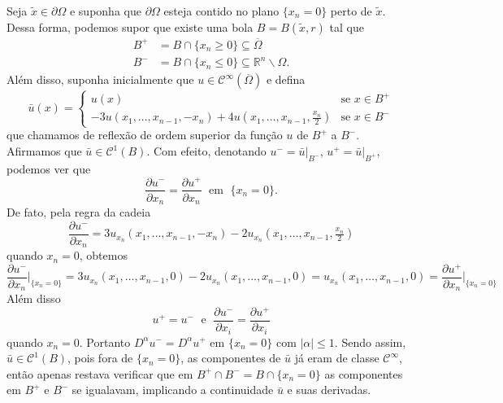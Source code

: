 \documentclass[a4paper, 11pt]{book}
\theoremstyle{definition}
\newcommand{\bR}{\mathbb{R}}
\newcommand{\cC}{\mathcal{C}}
\begin{document}
\begin{prf}
    Seja $\tilde x \in \partial\Omega$ e suponha que $\partial\Omega$ esteja contido no plano $\{x_n = 0\}$ perto de $\tilde x$.
    Dessa forma, podemos supor que existe uma bola $B = B(\tilde x, r)$ tal que
    \[
        \begin{aligned}
            B^+ &= B \cap \{x_n \geqslant 0\} \subseteq \overline\Omega\\
            B^- &= B \cap \{x_n \leqslant 0\} \subseteq \bR^n \smallsetminus \Omega.
        \end{aligned}
    \]
    Além disso, suponha inicialmente que $u \in \cC^\infty(\overline\Omega)$ e defina
    \[
        \bar u(x) =
        \left\{ 
            \begin{array}{ll}
                u(x) & \text{se } x\in B^+\\
                -3u(x_1,\dots,x_{n-1}, -x_n) + 4u(x_1,\dots,x_{n-1},\frac{x_n}{2}) & \text{se } x \in B^-
            \end{array}
        \right.
    \]
    que chamamos de reflexão de ordem superior da função $u$ de $B^+$ a $B^-$.
    Afirmamos que $\bar u \in \cC^1(B)$.
    Com efeito, denotando $u^- = \bar u \big|_{B^-}$, $u^+ = \bar u \big|_{B^+}$, podemos ver que
    \[
        \dfrac{\partial u^-}{\partial x_n} = \dfrac{\partial u^+}{\partial x_n} \;\text{ em }\; \{x_n = 0\}.
    \]
    De fato, pela regra da cadeia
    \[
        \dfrac{\partial u^-}{\partial x_n} = 3 u_{x_n}(x_1,\dots,x_{n-1}, -x_n)  - 2u_{x_n}(x_1,\dots,x_{n-1},\tfrac{x_n}{2})
    \]
    quando $x_n = 0$, obtemos
    \[
        \dfrac{\partial u^-}{\partial x_n} \Bigg|_{\{x_n = 0\}} = 3u_{x_n}(x_1,\dots,x_{n-1},0) - 2u_{x_n}(x_1,\dots,x_{n-1},0) = u_{x_n}(x_1,\dots,x_{n-1},0) = \dfrac{\partial u^+}{\partial x_n} \Bigg|_{\{x_n =0\}}
    \]
    Além disso
    \[
        u^+ = u^- \;\text{ e }\; \dfrac{\partial u^-}{\partial x_i} = \dfrac{\partial u^+}{\partial x_i}
    \]
    quando $x_n = 0$.
    Portanto $D^\alpha u^- = D^\alpha u^+$ em $\{x_n = 0\}$ com $|\alpha| \leqslant 1$. Sendo assim, $\bar u \in \cC^1 (B)$, pois fora de $\{x_n = 0\}$, as componentes de $\bar u$ já eram de classe $\cC^\infty$, então apenas restava verificar que em $B^+ \cap B^- = B \cap \{x_n = 0\}$ as componentes em $B^+$ e $B^-$ se igualavam, implicando a continuidade $\bar u$ e suas derivadas.


\end{prf}
\end{document}
